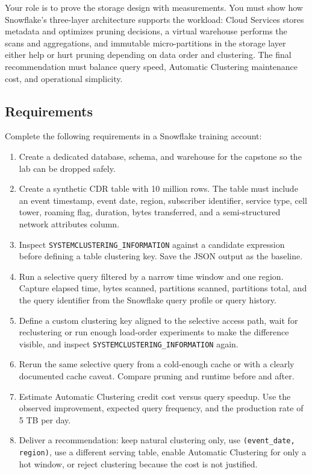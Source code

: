 Your role is to prove the storage design with measurements. You must show how Snowflake's three-layer architecture supports the workload: Cloud Services stores metadata and optimizes pruning decisions, a virtual warehouse performs the scans and aggregations, and immutable micro-partitions in the storage layer either help or hurt pruning depending on data order and clustering. The final recommendation must balance query speed, Automatic Clustering maintenance cost, and operational simplicity.

\subsection*{Requirements}
Complete the following requirements in a Snowflake training account:
\begin{enumerate}
    \item Create a dedicated database, schema, and warehouse for the capstone so the lab can be dropped safely.
    \item Create a synthetic CDR table with 10 million rows. The table must include an event timestamp, event date, region, subscriber identifier, service type, cell tower, roaming flag, duration, bytes transferred, and a semi-structured network attributes column.
    \item Inspect \texttt{SYSTEM\textdollar CLUSTERING\_INFORMATION} against a candidate expression before defining a table clustering key. Save the JSON output as the baseline.
    \item Run a selective query filtered by a narrow time window and one region. Capture elapsed time, bytes scanned, partitions scanned, partitions total, and the query identifier from the Snowflake query profile or query history.
    \item Define a custom clustering key aligned to the selective access path, wait for reclustering or run enough load-order experiments to make the difference visible, and inspect \texttt{SYSTEM\textdollar CLUSTERING\_INFORMATION} again.
    \item Rerun the same selective query from a cold-enough cache or with a clearly documented cache caveat. Compare pruning and runtime before and after.
    \item Estimate Automatic Clustering credit cost versus query speedup. Use the observed improvement, expected query frequency, and the production rate of 5 TB per day.
    \item Deliver a recommendation: keep natural clustering only, use \texttt{(event\_date, region)}, use a different serving table, enable Automatic Clustering for only a hot window, or reject clustering because the cost is not justified.
\end{enumerate}

